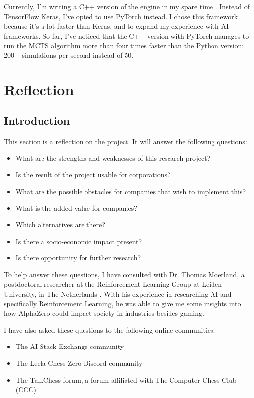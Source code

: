 \documentclass{article}
\begin{document}
Currently, I'm writing a C++ version of the engine in my spare time \cite{zjefferChessdeeprlcpp2022}. 
Instead of TensorFlow Keras, I've opted to use PyTorch instead. I chose this framework because 
it's a lot faster than Keras, and to expand my experience with AI frameworks.
So far, I've noticed that the C++ version with PyTorch manages to run the MCTS algorithm 
more than four times faster than the Python version: 200+ simulations per second instead of 50.




\newpage
\section{Reflection}

\subsection{Introduction}

This section is a reflection on the project. It will answer the following questions:

\begin{itemize}
    \item What are the strengths and weaknesses of this research project?
    \item Is the result of the project usable for corporations?
    \item What are the possible obstacles for companies that wish to implement this?
    \item What is the added value for companies?
    \item Which alternatives are there?
    \item Is there a socio-economic impact present?
    \item Is there opportunity for further research?
\end{itemize}

To help answer these questions, I have consulted with Dr. Thomas Moerland, a postdoctoral 
researcher at the Reinforcement Learning Group at Leiden University, in The Netherlands \cite{ThomasMoerlandPostdoc}. 
With his experience in researching AI and specifically Reinforcement Learning, he was able 
to give me some insights into how AlphaZero could impact society in industries besides gaming.

I have also asked these questions to the following online communities:

\begin{itemize}
    \item The AI Stack Exchange community \cite{zjefferHowCanAlphaZero2022,zjefferWhatCanWe2022}
    \item The Leela Chess Zero Discord community 
    \item The TalkChess forum, a forum affiliated with The Computer Chess Club (CCC)
\end{itemize}
\end{document}
